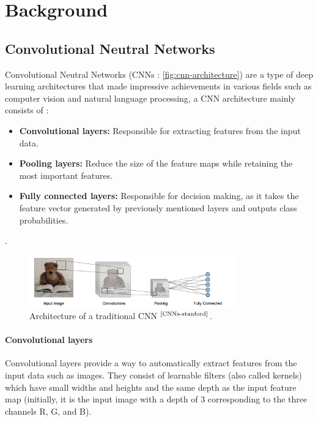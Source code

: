 \documentclass[
11pt, %
english, %
singlespacing, %
headsepline, %
]{project_structure}
\newcommand{\subpar}[1]{\paragraph*{#1}}
\begin{document}
\newpage
\section{Background}

\subsection{Convolutional Neutral Networks}

\noindent Convolutional Neutral Networks (\acrshort{CNN}s : \autoref{fig:cnn-architecture}) are a type of deep learning architectures that made impressive achievements in various fields such as computer vision and natural language processing, a \acrshort{CNN} architecture mainly consists of : 

\begin{itemize}
    \item \textbf{Convolutional layers:} Responsible for extracting features from the input data.
    \item \textbf{Pooling layers:} Reduce the size of the feature maps while retaining the most important features.
    \item \textbf{Fully connected layers:} Responsible for decision making, as it takes the feature vector generated by previously mentioned layers and outputs class probabilities.
\end{itemize}.

\begin{figure}[H]
    \centering
    \includegraphics[width=0.8\textwidth]{figures/background/architecture-cnn-en.jpeg}
    \caption{Architecture of a traditional \acrshort{CNN} $^{\text{\cite{CNNs-stanford}}}$.}
    \label{fig:cnn-architecture}
\end{figure}

\subpar{Convolutional layers}

\noindent Convolutional layers provide a way to automatically extract features from the input data such as images. They consist of learnable filters (also called kernels) which have small widths and heights and the same depth as the input feature map (initially, it is the input image with a depth of 3 corresponding to the three channels R, G, and B).
\end{document}
